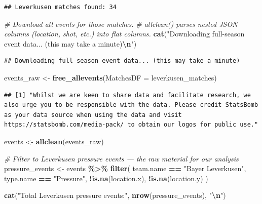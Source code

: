 \documentclass[
]{article}
\newenvironment{Shaded}{\begin{snugshade}}{\end{snugshade}}
\newcommand{\AttributeTok}[1]{\textcolor[rgb]{0.13,0.29,0.53}{#1}}
\newcommand{\CommentTok}[1]{\textcolor[rgb]{0.56,0.35,0.01}{\textit{#1}}}
\newcommand{\FunctionTok}[1]{\textcolor[rgb]{0.13,0.29,0.53}{\textbf{#1}}}
\newcommand{\NormalTok}[1]{#1}
\newcommand{\OtherTok}[1]{\textcolor[rgb]{0.56,0.35,0.01}{#1}}
\newcommand{\SpecialCharTok}[1]{\textcolor[rgb]{0.81,0.36,0.00}{\textbf{#1}}}
\newcommand{\StringTok}[1]{\textcolor[rgb]{0.31,0.60,0.02}{#1}}
\begin{document}
\begin{verbatim}
## Leverkusen matches found: 34
\end{verbatim}

\begin{Shaded}
\begin{Highlighting}[]
\CommentTok{\# Download all events for those matches.}
\CommentTok{\# allclean() parses nested JSON columns (location, shot, etc.) into flat columns.}
\FunctionTok{cat}\NormalTok{(}\StringTok{"Downloading full{-}season event data... (this may take a minute)}\SpecialCharTok{\textbackslash{}n}\StringTok{"}\NormalTok{)}
\end{Highlighting}
\end{Shaded}

\begin{verbatim}
## Downloading full-season event data... (this may take a minute)
\end{verbatim}

\begin{Shaded}
\begin{Highlighting}[]
\NormalTok{events\_raw }\OtherTok{\textless{}{-}} \FunctionTok{free\_allevents}\NormalTok{(}\AttributeTok{MatchesDF =}\NormalTok{ leverkusen\_matches)}
\end{Highlighting}
\end{Shaded}

\begin{verbatim}
## [1] "Whilst we are keen to share data and facilitate research, we also urge you to be responsible with the data. Please credit StatsBomb as your data source when using the data and visit https://statsbomb.com/media-pack/ to obtain our logos for public use."
\end{verbatim}

\begin{Shaded}
\begin{Highlighting}[]
\NormalTok{events     }\OtherTok{\textless{}{-}} \FunctionTok{allclean}\NormalTok{(events\_raw)}

\CommentTok{\# Filter to Leverkusen pressure events — the raw material for our analysis}
\NormalTok{pressure\_events }\OtherTok{\textless{}{-}}\NormalTok{ events }\SpecialCharTok{\%\textgreater{}\%}
  \FunctionTok{filter}\NormalTok{(}
\NormalTok{    team.name }\SpecialCharTok{==} \StringTok{"Bayer Leverkusen"}\NormalTok{,}
\NormalTok{    type.name  }\SpecialCharTok{==} \StringTok{"Pressure"}\NormalTok{,}
    \SpecialCharTok{!}\FunctionTok{is.na}\NormalTok{(location.x),}
    \SpecialCharTok{!}\FunctionTok{is.na}\NormalTok{(location.y)}
\NormalTok{  )}

\FunctionTok{cat}\NormalTok{(}\StringTok{"Total Leverkusen pressure events:"}\NormalTok{, }\FunctionTok{nrow}\NormalTok{(pressure\_events), }\StringTok{"}\SpecialCharTok{\textbackslash{}n}\StringTok{"}\NormalTok{)}
\end{Highlighting}
\end{Shaded}
\end{document}
